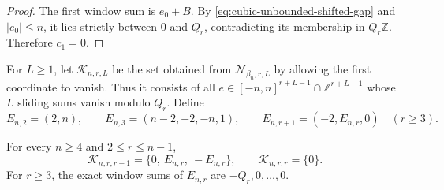 \begin{proof}
The first window sum is $e_0+B$.  By
\eqref{eq:cubic-unbounded-shifted-gap} and $|e_0|\le n$, it lies strictly
between $0$ and $Q_r$, contradicting its membership in $Q_r\mathbb Z$.
Therefore $c_1=0$.
\end{proof}

For $L\ge1$, let $\mathcal K_{n,r,L}$ be the set obtained from
$\mathcal N_{\beta_n,r,L}$ by allowing the first coordinate to vanish.
Thus it consists of all $e\in[-n,n]^{r+L-1}\cap\mathbb Z^{r+L-1}$ whose
$L$ sliding sums vanish modulo $Q_r$.  Define
\[
E_{n,2}=(2,n),
\qquad
E_{n,3}=(n-2,-2,-n,1),
\qquad
E_{n,r+1}=(-2,E_{n,r},0)\quad(r\ge3).
\]

\begin{lemma}
\label{lem:cubic-unbounded-terminal-paths}
For every $n\ge4$ and $2\le r\le n-1$,
\begin{equation}
\mathcal K_{n,r,r-1}=\{0,\ E_{n,r},\ -E_{n,r}\},
\qquad
\mathcal K_{n,r,r}=\{0\}.
\label{eq:cubic-unbounded-terminal-classification}
\end{equation}
For $r\ge3$, the exact window sums of $E_{n,r}$ are
$-Q_r,0,\ldots,0$.
\end{lemma}

